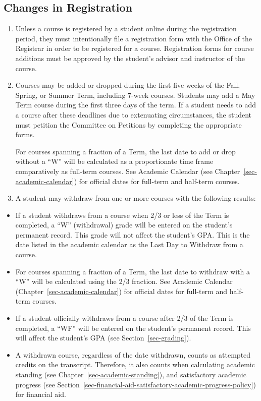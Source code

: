 \documentclass[
  letterpaper,
]{scrbook}
\providecommand{\tightlist}{%
  \setlength{\itemsep}{0pt}\setlength{\parskip}{0pt}}
\begin{document}
\subsection{Changes in Registration}\label{changes-in-registration}

\begin{enumerate}
\def\labelenumi{\arabic{enumi}.}
\item
  Unless a course is registered by a student online during the
  registration period, they must intentionally file a registration form
  with the Office of the Registrar in order to be registered for a
  course. Registration forms for course additions must be approved by
  the student's advisor and instructor of the course.
\item
  Courses may be added or dropped during the first five weeks of the
  Fall, Spring, or Summer Term, including 7-week courses. Students may
  add a May Term course during the first three days of the term. If a
  student needs to add a course after these deadlines due to extenuating
  circumstances, the student must petition the Committee on Petitions by
  completing the appropriate forms.

  For courses spanning a fraction of a Term, the last date to add or
  drop without a ``W'' will be calculated as a proportionate time frame
  comparatively as full-term courses. See Academic Calendar (see
  Chapter~\ref{sec-academic-calendar}) for official dates for full-term
  and half-term courses.
\item
  A student may withdraw from one or more courses with the following
  results:
\end{enumerate}

\begin{itemize}
\tightlist
\item
  If a student withdraws from a course when 2/3 or less of the Term is
  completed, a ``W'' (withdrawal) grade will be entered on the student's
  permanent record. This grade will not affect the student's GPA. This
  is the date listed in the academic calendar as the Last Day to
  Withdraw from a course.
\item
  For courses spanning a fraction of a Term, the last date to withdraw
  with a ``W'' will be calculated using the 2/3 fraction. See Academic
  Calendar (Chapter~\ref{sec-academic-calendar}) for official dates for
  full-term and half-term courses.
\item
  If a student officially withdraws from a course after 2/3 of the Term
  is completed, a ``WF'' will be entered on the student's permanent
  record. This will affect the student's GPA (see
  Section~\ref{sec-grading}).
\item
  A withdrawn course, regardless of the date withdrawn, counts as
  attempted credits on the transcript. Therefore, it also counts when
  calculating academic standing (see
  Chapter~\ref{sec-academic-standing}), and satisfactory academic
  progress (see
  Section~\ref{sec-financial-aid-satisfactory-academic-progress-policy})
  for financial aid.
\end{itemize}
\end{document}
